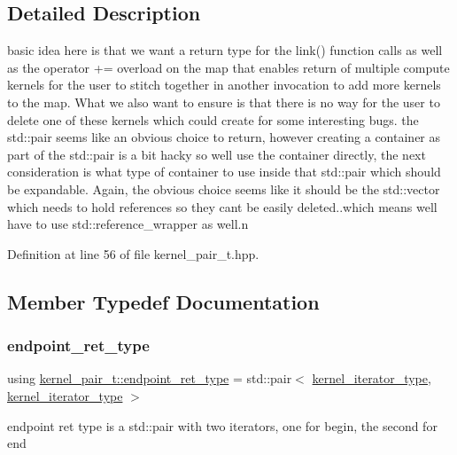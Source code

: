 \subsection{Detailed Description}
basic idea here is that we want a return type for the link() function calls as well as the operator += overload on the map that enables return of multiple compute kernels for the user to stitch together in another invocation to add more kernels to the map. What we also want to ensure is that there is no way for the user to delete one of these kernels which could create for some interesting bugs. the std\+::pair seems like an obvious choice to return, however creating a container as part of the std\+::pair is a bit hacky so we\textquotesingle{}ll use the container directly, the next consideration is what type of container to use inside that std\+::pair which should be expandable. Again, the obvious choice seems like it should be the std\+::vector which needs to hold references so they can\textquotesingle{}t be easily deleted..which means we\textquotesingle{}ll have to use std\+::reference\+\_\+wrapper as well.\+n 

Definition at line 56 of file kernel\+\_\+pair\+\_\+t.\+hpp.



\subsection{Member Typedef Documentation}
\hypertarget{classkernel__pair__t_abc3c7ff96f4f00f4e31c56fb2b7da728}{}\label{classkernel__pair__t_abc3c7ff96f4f00f4e31c56fb2b7da728} 
\subsubsection{\texorpdfstring{endpoint\+\_\+ret\+\_\+type}{endpoint\_ret\_type}}
{\footnotesize\ttfamily using \hyperlink{classkernel__pair__t_abc3c7ff96f4f00f4e31c56fb2b7da728}{kernel\+\_\+pair\+\_\+t\+::endpoint\+\_\+ret\+\_\+type} =  std\+::pair$<$ \hyperlink{classkernel__pair__t_acd6ec478738b84ddad1c863b7c8b55c1}{kernel\+\_\+iterator\+\_\+type}, \hyperlink{classkernel__pair__t_acd6ec478738b84ddad1c863b7c8b55c1}{kernel\+\_\+iterator\+\_\+type} $>$}

endpoint ret type is a std\+::pair with two iterators, one for begin, the second for end 

